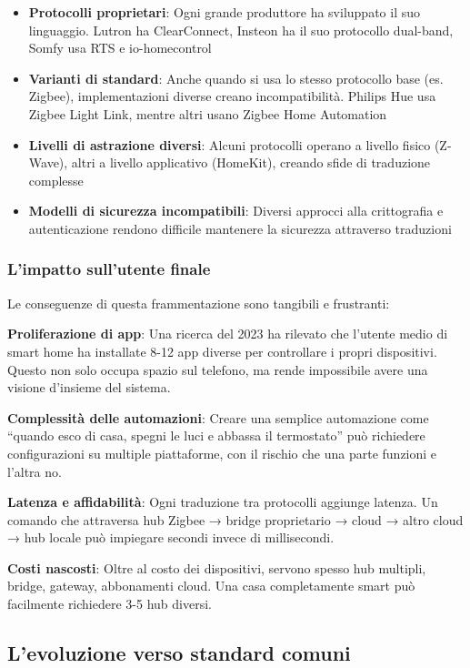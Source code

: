 \begin{itemize}
    \item \textbf{Protocolli proprietari}: Ogni grande produttore ha sviluppato il suo linguaggio. Lutron ha ClearConnect, Insteon ha il suo protocollo dual-band, Somfy usa RTS e io-homecontrol
    \item \textbf{Varianti di standard}: Anche quando si usa lo stesso protocollo base (es. Zigbee), implementazioni diverse creano incompatibilità. Philips Hue usa Zigbee Light Link, mentre altri usano Zigbee Home Automation
    \item \textbf{Livelli di astrazione diversi}: Alcuni protocolli operano a livello fisico (Z-Wave), altri a livello applicativo (HomeKit), creando sfide di traduzione complesse
    \item \textbf{Modelli di sicurezza incompatibili}: Diversi approcci alla crittografia e autenticazione rendono difficile mantenere la sicurezza attraverso traduzioni
\end{itemize}

\subsubsection{L'impatto sull'utente finale}

Le conseguenze di questa frammentazione sono tangibili e frustranti:

\textbf{Proliferazione di app}: Una ricerca del 2023 ha rilevato che l'utente medio di smart home ha installate 8-12 app diverse per controllare i propri dispositivi. Questo non solo occupa spazio sul telefono, ma rende impossibile avere una visione d'insieme del sistema.

\textbf{Complessità delle automazioni}: Creare una semplice automazione come ``quando esco di casa, spegni le luci e abbassa il termostato'' può richiedere configurazioni su multiple piattaforme, con il rischio che una parte funzioni e l'altra no.

\textbf{Latenza e affidabilità}: Ogni traduzione tra protocolli aggiunge latenza. Un comando che attraversa hub Zigbee → bridge proprietario → cloud → altro cloud → hub locale può impiegare secondi invece di millisecondi.

\textbf{Costi nascosti}: Oltre al costo dei dispositivi, servono spesso hub multipli, bridge, gateway, abbonamenti cloud. Una casa completamente smart può facilmente richiedere 3-5 hub diversi.

\subsection{L'evoluzione verso standard comuni}

